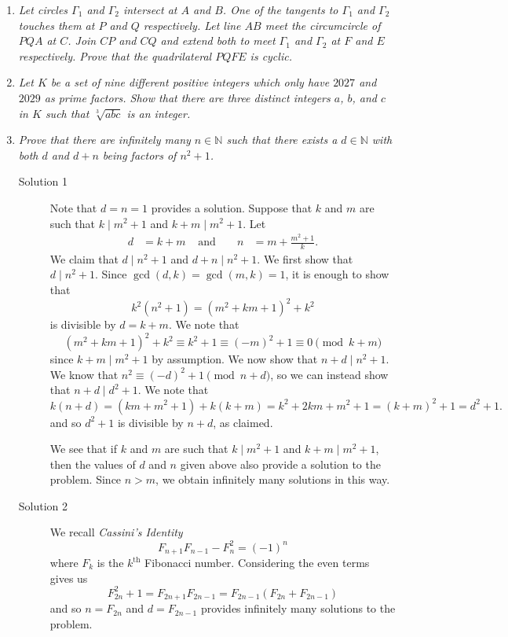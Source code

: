 \documentclass{article}
\begin{document}
\begin{enumerate}[1.]
  
  \item %
  {\itshape Let circles $\Gamma_1$ and $\Gamma_2$ intersect at $A$ and $B$. One of the tangents to $\Gamma_1$ and $\Gamma_2$ touches them at $P$ and $Q$ respectively. Let line $AB$ meet the circumcircle of $PQA$ at $C$. Join $CP$ and $CQ$ and extend both to meet $\Gamma_1$ and $\Gamma_2$ at $F$ and $E$ respectively. Prove that the quadrilateral $PQFE$ is cyclic.}
  
  
  \item %
  {\itshape Let $K$ be a set of nine different positive integers which only have $2027$ and $2029$ as prime factors.
  Show that there are three distinct integers $a$, $b$, and $c$ in $K$ such that $\sqrt[3]{abc}$ is an integer.}
  
  
  \item %
  {\itshape Prove that there are infinitely many $n \in \mathbb{N}$ such that there exists a $d \in \mathbb{N}$ with both $d$ and $d + n$ being factors of $n^2 + 1$.}
  
  \begin{description}
    \item[Solution 1] Note that $d = n = 1$ provides a solution. Suppose that $k$ and $m$ are such that $k \mid m^2 + 1$ and $k + m \mid m^2 + 1$. Let
    \begin{align*}
      d & = k + m & \text{ and } && n & = m + \frac{m^2 + 1}{k}.
    \end{align*}
    We claim that $d \mid n^2 + 1$ and $d + n \mid n^2 + 1$. We first show that $d \mid n^2 + 1$. Since $\gcd(d, k) = \gcd(m, k) = 1$, it is enough to show that
    \[
      k^2 (n^2 + 1) = (m^2 + km + 1)^2 + k^2
    \]
    is divisible by $d = k + m$. We note that
    \[
      (m^2 + km + 1)^2 + k^2 \equiv k^2 + 1 \equiv (-m)^2 + 1 \equiv 0 \pmod{k + m}
    \]
    since $k + m \mid m^2 + 1$ by assumption. We now show that $n + d \mid n^2 + 1$. We know that $n^2 \equiv (-d)^2 + 1 \pmod{n + d}$, so we can instead show that $n + d \mid d^2 + 1$. We note that
    \[
      k(n + d) = (km + m^2 + 1) + k(k + m) = k^2 + 2km + m^2 + 1 = (k + m)^2 + 1 = d^2 + 1.
    \]
    and so $d^2 + 1$ is divisible by $n + d$, as claimed.

    We see that if $k$ and $m$ are such that $k \mid m^2 + 1$ and $k + m \mid m^2 + 1$, then the values of $d$ and $n$ given above also provide a solution to the problem. Since $n > m$, we obtain infinitely many solutions in this way.

    \item[Solution 2] We recall \emph{Cassini's Identity}
    \[
      F_{n + 1} F_{n - 1} - F_n^2 = (-1)^n
    \] 
    where $F_k$ is the $k^\text{th}$ Fibonacci number. Considering the even terms gives us
    \[
      F_{2n}^2 + 1 = F_{2n + 1} F_{2n - 1} = F_{2n - 1} (F_{2n} + F_{2n - 1})
    \]
    and so $n = F_{2n}$ and $d = F_{2n - 1}$ provides infinitely many solutions to the problem.
  \end{description}

  \end{enumerate}
  
\end{document}
